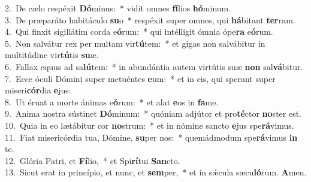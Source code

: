 {2.~}De cælo respéxit \textbf{Dó}minus:~* vidit omnes \textbf{fí}lios \textbf{hó}minum.\\
{3.~}De præparáto habitáculo \textbf{su}o~* respéxit super omnes, qui \textbf{há}bitant \textbf{ter}ram.\\
{4.~}Qui finxit sigillátim corda e\textbf{ó}rum:~* qui intélligit ómnia ópe\textbf{ra} e\textbf{ó}rum.\\
{5.~}Non salvátur rex per multam vir\textbf{tú}tem:~* et gigas non salvábitur in multitúdine vir\textbf{tú}tis \textbf{su}æ.\\
{6.~}Fallax equus ad sa\textbf{lú}tem:~* in abundántia autem virtútis suæ \textbf{non} sal\textbf{vá}bitur.\\
{7.~}Ecce óculi Dómini super metuéntes \textbf{e}um:~* et in eis, qui sperant super miseri\textbf{cór}dia \textbf{e}jus:\\
{8.~}Ut éruat a morte ánimas e\textbf{ó}rum:~* et alat \textbf{e}os in \textbf{fa}me.\\
{9.~}Anima nostra sústinet \textbf{Dó}minum:~* quóniam adjútor et pro\textbf{té}ctor \textbf{no}ster est.\\
{10.~}Quia in eo lætábitur cor \textbf{no}strum:~* et in nómine sancto \textbf{e}jus spe\textbf{rá}vimus.\\
{11.~}Fiat misericórdia tua, Dómine, \textbf{su}per nos:~* quemádmodum spe\textbf{rá}vimus \textbf{in} te.\\
{12.~}Glória Patri, et \textbf{Fí}lio,~* et Spi\textbf{rí}tui \textbf{San}cto.\\
{13.~}Sicut erat in princípio, et nunc, et \textbf{sem}per,~* et in sǽcula sæcu\textbf{ló}rum. \textbf{A}men.\\
